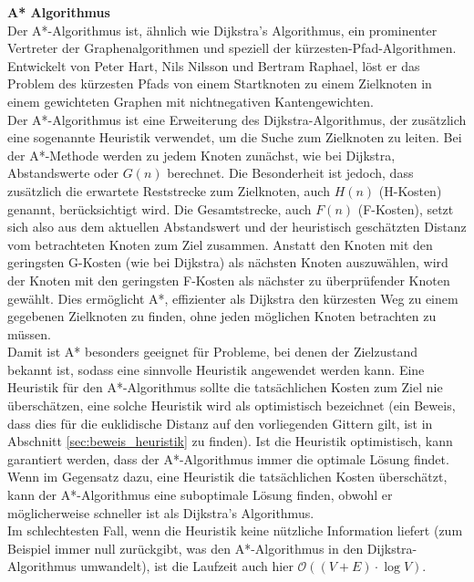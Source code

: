 \textbf{A* Algorithmus}\\
Der A*-Algorithmus ist, ähnlich wie Dijkstra's Algorithmus, ein prominenter Vertreter der Graphenalgorithmen und speziell
der kürzesten-Pfad-Algorithmen.
Entwickelt von Peter Hart, Nils Nilsson und Bertram Raphael, löst er das Problem des kürzesten Pfads von einem Startknoten
zu einem Zielknoten in einem gewichteten Graphen mit nichtnegativen Kantengewichten. \cite{hart1968}\\
Der A*-Algorithmus ist eine Erweiterung des Dijkstra-Algorithmus, der zusätzlich eine sogenannte Heuristik verwendet,
um die Suche zum Zielknoten zu leiten.
Bei der A*-Methode werden zu jedem Knoten zunächst, wie bei Dijkstra, Abstandswerte oder $G(n)$ berechnet.
Die Besonderheit ist jedoch, dass zusätzlich die erwartete Reststrecke zum Zielknoten, auch $H(n)$ (H-Kosten) genannt, berücksichtigt wird.
Die Gesamtstrecke, auch $F(n)$ (F-Kosten), setzt sich also aus dem aktuellen Abstandswert und der heuristisch geschätzten
Distanz vom betrachteten Knoten zum Ziel zusammen.
Anstatt den Knoten mit den geringsten G-Kosten (wie bei Dijkstra) als nächsten Knoten auszuwählen, wird der
Knoten mit den geringsten F-Kosten als nächster zu überprüfender Knoten gewählt.
Dies ermöglicht A*, effizienter als Dijkstra den kürzesten Weg zu einem gegebenen Zielknoten zu finden, ohne jeden
möglichen Knoten betrachten zu müssen.\\
Damit ist A* besonders geeignet für Probleme, bei denen der Zielzustand bekannt ist, sodass eine sinnvolle Heuristik angewendet werden kann. \cite{hart1968}
Eine Heuristik für den A*-Algorithmus sollte die tatsächlichen Kosten zum Ziel nie überschätzen, eine solche Heuristik
wird als optimistisch bezeichnet (ein Beweis, dass dies für die euklidische Distanz auf den vorliegenden Gittern gilt, ist in Abschnitt \ref{sec:beweis_heuristik} zu finden).
Ist die Heuristik optimistisch, kann garantiert werden, dass der A*-Algorithmus immer die optimale Lösung findet.
Wenn im Gegensatz dazu, eine Heuristik die tatsächlichen Kosten überschätzt, kann der A*-Algorithmus eine suboptimale
Lösung finden, obwohl er möglicherweise schneller ist als Dijkstra's Algorithmus.\\
Im schlechtesten Fall, wenn die Heuristik keine nützliche Information liefert (zum Beispiel immer null zurückgibt, was den
A*-Algorithmus in den Dijkstra-Algorithmus umwandelt), ist die Laufzeit auch hier $\mathcal{O}((V+E)\cdot\log V)$.\\\\

